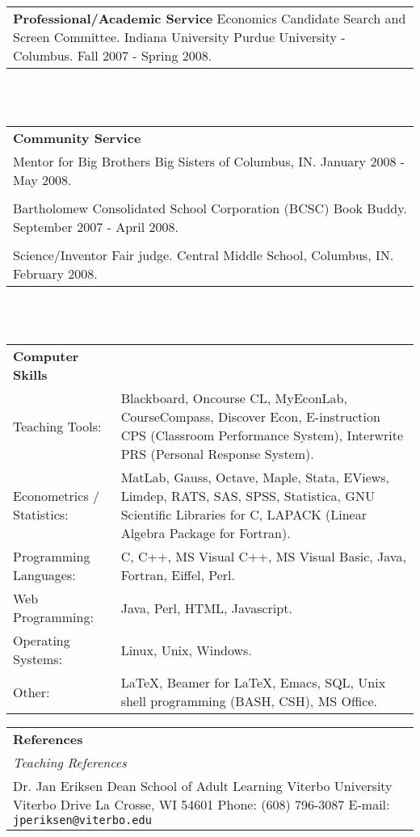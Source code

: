 \documentclass[12pt,notitlepage,oneside]{book}
\begin{document}
\begin{singlespace}
\begin{tabular}{p{5.5in}}
\textbf{Professional/Academic Service} \newline
Economics Candidate Search and Screen Committee.  Indiana University Purdue University - Columbus. Fall 2007 - Spring 2008.
\end{tabular} \\ \\

\begin{tabular}{p{5.5in}}
\textbf{Community Service} \\
Mentor for Big Brothers Big Sisters of Columbus, IN.  January 2008 - May 2008.\\\\
Bartholomew Consolidated School Corporation (BCSC) Book Buddy.  September 2007 - April 2008.\\\\
Science/Inventor Fair judge.  Central Middle School, Columbus, IN.  February 2008. 
\end{tabular} \\ \\

\begin{tabular}{p{2in} p{3.3in}}
\textbf{Computer Skills} & \\
Teaching Tools: & Blackboard, Oncourse CL, MyEconLab, CourseCompass, Discover Econ, E-instruction CPS (Classroom Performance System), Interwrite PRS (Personal Response System). \\
Econometrics / Statistics: & MatLab, Gauss, Octave, Maple, Stata, EViews, Limdep, RATS, SAS, SPSS, Statistica, GNU Scientific Libraries for C, LAPACK (Linear Algebra Package for Fortran). \\
Programming Languages: & C, C++, MS Visual C++, MS Visual Basic, Java, Fortran, Eiffel, Perl. \\
Web Programming: & Java, Perl, HTML, Javascript. \\
Operating Systems: & Linux, Unix, Windows.\\
Other: & \LaTeX, Beamer for \LaTeX, Emacs, SQL, Unix shell programming (BASH, CSH), MS Office. \\
\end{tabular} 
\newpage

\thispagestyle{empty}
\begin{tabular}{p{2.5in}p{2.5in}}
\textbf{References} & \\
\emph{Teaching References} &  \\
Dr. Jan Eriksen \newline
Dean \newline
School of Adult Learning \newline
Viterbo University \newline
900 Viterbo Drive \newline
La Crosse, WI 54601 \newline
Phone: (608) 796-3087\newline
E-mail: \texttt{jperiksen@viterbo.edu} &


\end{tabular}
\end{singlespace}
\end{document}
